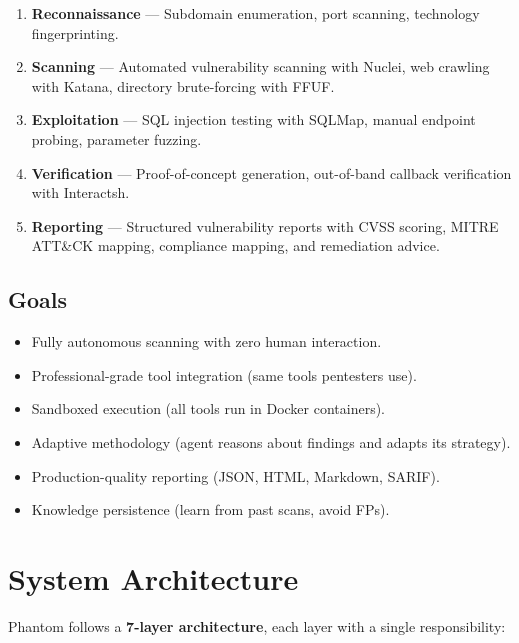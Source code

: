 \documentclass[12pt,a4paper]{article}
\begin{document}
\begin{enumerate}
    \item \textbf{Reconnaissance} — Subdomain enumeration, port scanning,
          technology fingerprinting.
    \item \textbf{Scanning} — Automated vulnerability scanning with Nuclei,
          web crawling with Katana, directory brute-forcing with FFUF.
    \item \textbf{Exploitation} — SQL injection testing with SQLMap,
          manual endpoint probing, parameter fuzzing.
    \item \textbf{Verification} — Proof-of-concept generation, out-of-band
          callback verification with Interactsh.
    \item \textbf{Reporting} — Structured vulnerability reports with CVSS scoring,
          MITRE ATT\&CK mapping, compliance mapping, and remediation advice.
\end{enumerate}

\subsection{Goals}

\begin{itemize}[leftmargin=2cm]
    \item[\textbf{G1}] Fully autonomous scanning with zero human interaction.
    \item[\textbf{G2}] Professional-grade tool integration (same tools pentesters use).
    \item[\textbf{G3}] Sandboxed execution (all tools run in Docker containers).
    \item[\textbf{G4}] Adaptive methodology (agent reasons about findings and
          adapts its strategy).
    \item[\textbf{G5}] Production-quality reporting (JSON, HTML, Markdown, SARIF).
    \item[\textbf{G6}] Knowledge persistence (learn from past scans, avoid FPs).
\end{itemize}

\section{System Architecture}

Phantom follows a \textbf{7-layer architecture}, each layer with a single
responsibility:
\end{document}
